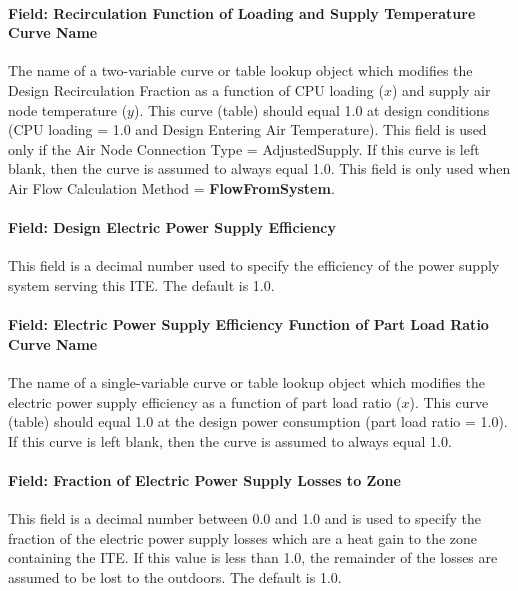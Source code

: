 \paragraph{Field: Recirculation Function of Loading and Supply Temperature Curve Name}\label{field-recirculation-function-of-loading-and-supply-temperature-curve-name}

The name of a two-variable curve or table lookup object which modifies the Design Recirculation Fraction as a function of CPU loading ($x$) and supply air node temperature ($y$). This curve (table) should equal 1.0 at design conditions (CPU loading = 1.0 and Design Entering Air Temperature). This field is used only if the Air Node Connection Type = AdjustedSupply. If this curve is left blank, then the curve is assumed to always equal 1.0. This field is only used when Air Flow Calculation Method = \textbf{FlowFromSystem}.

\paragraph{Field: Design Electric Power Supply Efficiency}\label{field-design-electric-power-supply-efficiency}

This field is a decimal number used to specify the efficiency of the power supply system serving this ITE. The default is 1.0.

\paragraph{Field: Electric Power Supply Efficiency Function of Part Load Ratio Curve Name}\label{field-electric-power-supply-efficiency-function-of-part-load-ratio-curve-name}

The name of a single-variable curve or table lookup object which modifies the electric power supply efficiency as a function of part load ratio ($x$). This curve (table) should equal 1.0 at the design power consumption (part load ratio = 1.0). If this curve is left blank, then the curve is assumed to always equal 1.0.

\paragraph{Field: Fraction of Electric Power Supply Losses to Zone}\label{field-fraction-of-electric-power-supply-losses-to-zone}

This field is a decimal number between 0.0 and 1.0 and is used to specify the fraction of the electric power supply losses which are a heat gain to the zone containing the ITE. If this value is less than 1.0, the remainder of the losses are assumed to be lost to the outdoors. The default is 1.0.

